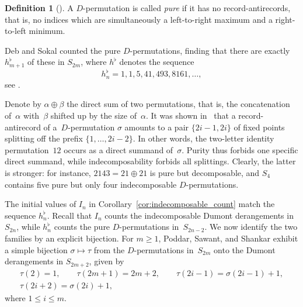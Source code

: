 \documentclass[pdftex]{sigma}
\numberwithin{equation}{section}
\theoremstyle{definition}
\newtheorem{Definition}[Theorem]{Definition}
\begin{document}
\begin{Definition}[\cite{DebSokal2024}]
	\label{def:pure_D_permutations}
	A $D$-permutation is called \emph{pure} if it has no
	record-antirecords, that is, no indices which are simultaneously a
	left-to-right maximum and a right-to-left minimum.
\end{Definition}

Deb and Sokal \cite{DebSokal2024} counted the pure $D$-permutations, finding that
there are exactly $h^\flat_{m+1}$ of these in $S_{2m}$, where $h^\flat$
denotes the sequence
\begin{equation*}
	h^\flat_n=1,1,5,41,493,8161,\dots,
\end{equation*}
see \cite[A362111]{OEIS}.

Denote by $\alpha\oplus\beta$ the direct sum of two permutations, that is, the
concatenation of~$\alpha$ with~$\beta$ shifted up by the size of~$\alpha$.
It was shown in~\cite{DebSokal2024} that a record-antirecord of a~$D$-permutation $\sigma$
amounts to a pair $\{2i-1,2i\}$ of fixed points splitting off the prefix
$\{1,\dots,2i-2\}$. In other words, the two-letter identity permutation~$12$ occurs as a direct summand of~$\sigma$.
Purity thus forbids one specific direct summand, while
indecomposability forbids all splittings. Clearly, the latter is stronger: for
instance, $2143=21\oplus21$ is pure but decomposable, and $S_4$ contains
five pure but only four indecomposable $D$-permutations.

The initial values of $I_n$ in Corollary~\ref{cor:indecomposable_count} match the
sequence $h^\flat_n$.
Recall that
$I_n$ counts the
indecomposable Dumont derangements in $S_{2n}$, while $h^\flat_n$
counts the pure $D$-permutations in~$S_{2n-2}$.
We now identify the two families by an explicit bijection.
For $m\ge1$, Poddar, Sawant, and Shankar
\cite[Theorem~6.2]{PoddarSawantShankar2026} exhibit a simple bijection
$\sigma\mapsto\tau$ from the $D$-permutations in~$S_{2m}$ onto the Dumont
derangements in $S_{2m+2}$, given by
\begin{gather}
\tau(2)=1,\qquad \tau(2m+1)=2m+2,\qquad
	\tau(2i-1)=\sigma(2i-1)+1,\nonumber\\
	\tau(2i+2)=\sigma(2i)+1,\label{eq:PSS_map}
\end{gather}
where $1\le i\le m$.
\end{document}
